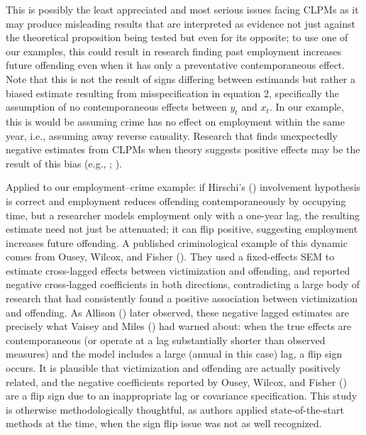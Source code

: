 \documentclass[
  letterpaper,
  DIV=11,
  numbers=noendperiod]{scrartcl}
\begin{document}
This is possibly the least appreciated and most serious issues facing
CLPMs as it may produce misleading results that are interpreted as
evidence not just against the theoretical proposition being tested but
even for its opposite; to use one of our examples, this could result in
research finding past employment increases future offending even when it
has only a preventative contemporaneous effect. Note that this is not
the result of signs differing between estimands but rather a biased
estimate resulting from misspecification in equation 2, specifically the
assumption of no contemporaneous effects between \(y_t\) and \(x_t\). In
our example, this is would be assuming crime has no effect on employment
within the same year, i.e., assuming away reverse causality. Research
that finds unexpectedly negative estimates from CLPMs when theory
suggests positive effects may be the result of this bias (e.g.,
; ).

Applied to our employment--crime example: if Hirschi's
() involvement hypothesis is
correct and employment reduces offending contemporaneously by occupying
time, but a researcher models employment only with a one-year lag, the
resulting estimate need not just be attenuated; it can flip positive,
suggesting employment increases future offending. A published
criminological example of this dynamic comes from Ousey, Wilcox, and
Fisher (). They used a
fixed-effects SEM to estimate cross-lagged effects between victimization
and offending, and reported negative cross-lagged coefficients in both
directions, contradicting a large body of research that had consistently
found a positive association between victimization and offending. As
Allison () later observed, these
negative lagged estimates are precisely what Vaisey and Miles
() had warned about: when the true
effects are contemporaneous (or operate at a lag substantially shorter
than observed measures) and the model includes a large (annual in this
case) lag, a flip sign occurs. It is plausible that victimization and
offending are actually positively related, and the negative coefficients
reported by Ousey, Wilcox, and Fisher
() are a flip sign due to an
inappropriate lag or covariance specification. This study is otherwise
methodologically thoughtful, as authors applied state-of-the-start
methods at the time, when the sign flip issue was not as well
recognized.
\end{document}
